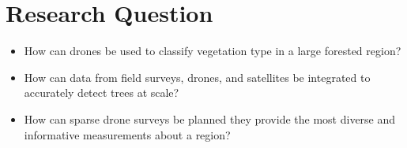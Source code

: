 
\chapter{Research Question} \label{chapResearchQuestion}

\begin{itemize}
    \item How can drones be used to classify vegetation type in a large forested region?
    \item How can data from field surveys, drones, and satellites be integrated to accurately detect trees at scale?
    \item How can sparse drone surveys be planned they provide the most diverse and informative measurements about a region?
\end{itemize}